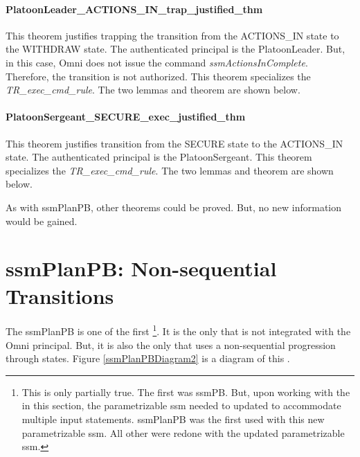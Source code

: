 \documentclass[../../main/main.tex]{subfiles}
\begin{document}
\paragraph*{PlatoonLeader_ACTIONS_IN_trap_justified_thm}
This theorem justifies trapping the transition from the ACTIONS_IN state to the WITHDRAW state.  The authenticated principal is the PlatoonLeader.  But, in this case, Omni does not issue the command \textit{ssmActionsInComplete}.  Therefore, the transition is not authorized.  This theorem specializes the \textit{TR_exec_cmd_rule}.  The two lemmas and theorem are shown below.

\HOLssmConductORPTheoremsPlatoonLeaderXXACTIONSXXINXXtrapXXlemma
\HOLssmConductORPTheoremsPlatoonLeaderXXACTIONSXXINXXtrapXXjustifiedXXlemma
\HOLssmConductORPTheoremsPlatoonLeaderXXACTIONSXXINXXtrapXXjustifiedXXthm


\paragraph*{PlatoonSergeant_SECURE_exec_justified_thm}
This theorem justifies transition from the SECURE state to the ACTIONS_IN  state.  The authenticated principal is the PlatoonSergeant.  This theorem specializes the \textit{TR_exec_cmd_rule}.  The two lemmas and theorem are shown below.

As with ssmPlanPB, other theorems could be proved.  But, no new information would be gained.

\section{ssmPlanPB: Non-sequential Transitions}
The ssmPlanPB  is one of the first \footnote{This is only partially true.  The first  was ssmPB.  But, upon working with the  in this section, the parametrizable ssm needed to updated to accommodate multiple input statements.  ssmPlanPB was the first  used with this new parametrizable ssm.  All other  were redone with the updated parametrizable ssm.}. It is the only  that is not integrated with the Omni principal.  But, it is also the only  that uses a non-sequential progression through states.  Figure \ref{ssmPlanPBDiagram2} is a diagram of this .
\end{document}
